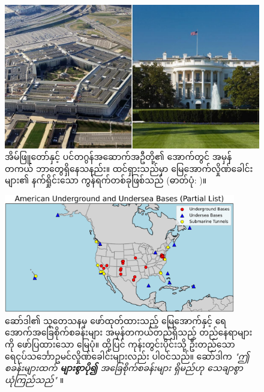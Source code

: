 \documentclass[10pt,twocolumn,letterpaper]{article}
\begin{document}
\begin{figure}[b]
\begin{center}
   \includegraphics[width=1\linewidth]{penta.jpg}
\end{center}
   \caption{အိမ်ဖြူတော်နှင့် ပင်တဂွန်အဆောက်အဦတို့၏ အောက်တွင် အမှန်တကယ် ဘာတွေရှိနေသနည်း။ ထင်ရှားသည်မှာ မြေအောက်လှိုဏ်ခေါင်းများ၏ နက်ရှိုင်းသော ကွန်ရက်တစ်ခုဖြစ်သည် (ဓာတ်ပုံ: \cite{31})။}
\label{fig:3}
\label{fig:onecol}
\end{figure}
\begin{figure}[t]
\begin{center}
\includegraphics[width=0.9\textwidth]{basescrop.png}
\end{center}
\caption{ဆော်ဒါ၏ သုတေသနမှ ဖော်ထုတ်ထားသည့် မြေအောက်နှင့် ရေအောက်အခြေစိုက်စခန်းများ အမှန်တကယ်တည်ရှိသည့် တည်နေရာများကို ဖော်ပြထားသော မြေပုံ။ ထို့ပြင် ကုန်းတွင်းပိုင်းသို့ ဦးတည်သော ရေငုပ်သင်္ဘောဥမင်လှိုဏ်ခေါင်းများလည်း ပါဝင်သည်။ ဆော်ဒါက \textit{"ဤစခန်းများထက် \textbf{များစွာပို၍} အခြေစိုက်စခန်းများ ရှိမည်ဟု သေချာစွာယုံကြည်သည်"} \cite{22}။}
\label{fig:4}
\end{figure}
\end{document}
